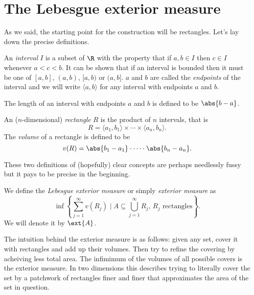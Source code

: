 \documentclass[12pt,oneside]{book}
\begin{document}
\section{The Lebesgue exterior measure}
As we said, the starting point for the construction will be rectangles. Let's lay down the precise definitions.
\begin{definition}[Interval]
	An \emph{interval} \( I \) is a subset of \( \R \) with the property that if \( a, b \in I \) then \( c \in I \) whenever \( a < c < b \). It can be shown that if an interval is bounded then it must be one of \( [a,b] \), \( (a,b) \), \( [a,b) \) or \( (a,b] \). \( a \) and \( b \) are called the \emph{endpoints} of the interval and we will write \( \langle a,b \rangle \) for any interval with endpoints \( a \) and \( b \).

The length of an interval with endpoints \( a \) and \( b \) is defined to be \( \abs{b - a} \).
\end{definition}

\begin{definition}[Rectangle]
	An (\( n \)-dimensional) \emph{rectangle} \( R \) is the product of \( n \) intervals, that is
	\begin{equation*}
		R = \langle a_1, b_1 \rangle \times \cdots \times \langle a_n, b_n \rangle.
	\end{equation*}
	The \emph{volume} of a rectangle is defined to be
	\begin{equation*}
		v(R) = \abs{b_1 - a_1} \cdot \cdots \cdot \abs{b_n - a_n}.
	\end{equation*}
\end{definition}
These two definitions of (hopefully) clear concepts are perhaps needlessly fussy but it pays to be precise in the beginning.

\begin{definition}
	We define the \emph{Lebesgue exterior measure} or simply \emph{exterior measure} as
	\begin{equation*}
		\inf \left\{ \sum_{j = 1}^{\infty} v(R_j) \mid A \subseteq \bigcup_{j = 1}^{\infty}R_j \text{, }R_j\text{ rectangles} \right\}.
	\end{equation*}
	We will denote it by \( \ext{A} \).
\end{definition}
The intuition behind the exterior measure is as follows: given any set, cover it with rectangles and add up their volumes. Then try to refine the covering by acheiving less total area. The infimimum of the volumes of all possible covers is the exterior measure. In two dimensions this describes trying to literally cover the set by a patchwork of rectangles finer and finer that approximates the area of the set in question.
\end{document}
